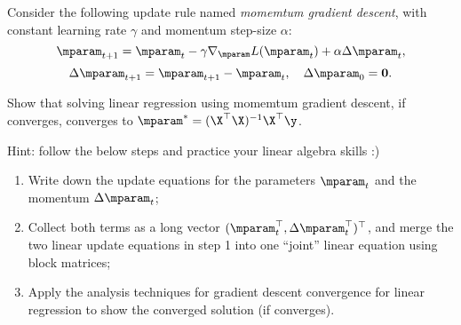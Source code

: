 \begin{question}
\label{q:momemtum_gd}
Consider the following update rule named \emph{momemtum gradient descent}, with constant learning rate $\gamma$ and momentum step-size $\alpha$:
$$\mparam_{t+1} = \mparam_t - \gamma \nabla_{\mparam} L(\mparam_t) + \alpha \Delta \mparam_t,$$
$$\Delta \mparam_{t+1} = \mparam_{t+1} - \mparam_t, \quad \Delta \mparam_{0} = \bm{0}.$$

Show that solving linear regression using momemtum gradient descent, if converges, converges to $\mparam^* = (\X^\top \X)^{-1} \X^\top \y$.

Hint: follow the below steps and practice your linear algebra skills :)
\begin{enumerate}
    \item Write down the update equations for the parameters $\mparam_t$ and the momentum $\Delta \mparam_t$;
    \item Collect both terms as a long vector $(\mparam_t^\top, \Delta \mparam_t^\top)^\top$, and merge the two linear update equations in step 1 into one ``joint'' linear equation using block matrices;
    \item Apply the analysis techniques for gradient descent convergence for linear regression to show the converged solution (if converges).
\end{enumerate}

\end{question}